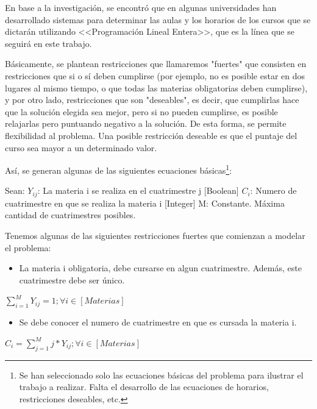 \documentclass[a4paper]{article}
\begin{document}
En base a la investigación, se encontró que en algunas universidades han desarrollado sistemas para determinar las aulas y los horarios de los cursos que se dictarán utilizando <<Programación Lineal Entera>>, que es la línea que se seguirá en este trabajo.

Básicamente, se plantean restricciones que llamaremos "fuertes"  que consisten en restricciones que si o sí deben cumplirse (por ejemplo, no es posible estar en dos lugares al mismo tiempo, o que todas las materias obligatorias deben cumplirse), y por otro lado, restricciones que son "deseables", es decir, que cumplirlas hace que la solución elegida sea mejor, pero si no pueden cumplirse, es posible relajarlas pero puntuando negativo a la solución. De esta forma, se permite flexibilidad al problema. Una posible restricción deseable es que el puntaje del curso sea mayor a un determinado valor.

Así, se generan algunas de las siguientes ecuaciones básicas\footnote{Se han seleccionado solo las ecuaciones básicas del problema para ilustrar el trabajo a realizar. Falta el desarrollo de las ecuaciones de horarios, restricciones deseables, etc.}:\newline

Sean:\newline
$Y_{ij}$: La materia i se realiza en el cuatrimestre j [Boolean]\newline
$C_{i}$: Numero de cuatrimestre en que se realiza la materia i [Integer]\newline
M: Constante. Máxima cantidad de cuatrimestres posibles. \newline

Tenemos algunas de las siguientes restricciones fuertes que comienzan a modelar el problema:

\begin{itemize}
	\item La materia i obligatoria, debe cursarse en algun cuatrimestre. Además, este cuatrimestre debe ser único.
\end{itemize}

$\sum_{i=1}^{M} Y_{ij} = 1;  \forall i \in [Materias]$

\begin{itemize}
	\item Se debe conocer el numero de cuatrimestre en que es cursada la materia i.
\end{itemize}

$C_{i} = \sum_{j=1}^{M} j * Y_{ij};  \forall i \in [Materias]$
\end{document}
